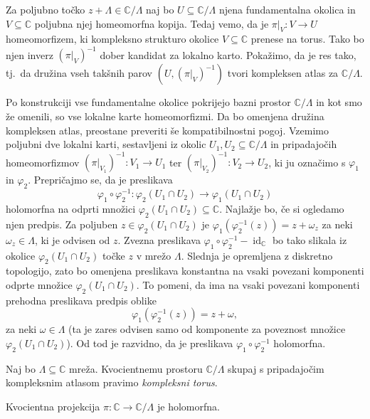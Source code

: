 \documentclass[mat1]{fmfdelo}
\numberwithin{equation}{section}
\newcommand{\C}{\mathbb C}
\newcommand{\om}{\omega}
\newcommand{\inv}{^{-1}}
\newcommand{\torus}{\C/\Lambda}
\newcommand{\tj}{tj.\ }
\DeclareMathOperator{\id}{id}
\theoremstyle{definition}
\begin{document}
\begin{dokaz}
    Za poljubno točko $z + \Lambda \in \torus$ naj bo $U \subseteq \torus$ njena fundamentalna okolica in $V \subseteq \C$ poljubna njej homeomorfna kopija. Tedaj vemo, da je $\pi|_V : V \to U$ homeomorfizem, ki kompleksno strukturo okolice $V \subseteq \C$ prenese na torus. Tako bo njen inverz $(\pi|_V)\inv$ dober kandidat za lokalno karto. Pokažimo, da je res tako, \tj da družina vseh takšnih parov $(U, (\pi|_V)\inv)$ tvori kompleksen atlas za $\torus$. 

    Po konstrukciji vse fundamentalne okolice pokrijejo bazni prostor $\torus$ in kot smo že omenili, so vse lokalne karte homeomorfizmi. Da bo omenjena družina kompleksen atlas, preostane preveriti še kompatibilnostni pogoj. Vzemimo poljubni dve lokalni karti, sestavljeni iz okolic $U_1, U_2 \subseteq \torus$ in pripadajočih homeomorfizmov $(\pi|_{V_1})\inv : V_1 \to U_1$ ter $(\pi|_{V_2})\inv : V_2 \to U_2$, ki ju označimo s $\varphi_1$ in $\varphi_2$. Prepričajmo se, da je preslikava 
    \[
        \varphi_1 \circ \varphi_2\inv : \varphi_2(U_1 \cap U_2) \to  \varphi_1(U_1 \cap U_2)
    \]
    holomorfna na odprti množici $\varphi_2(U_1 \cap U_2) \subseteq \C$. Najlažje bo, če si ogledamo njen predpis. Za poljuben $z \in \varphi_2(U_1 \cap U_2)$ je $\varphi_1(\varphi_2\inv(z)) = z + \om_z$ za neki $\om_z \in \Lambda$, ki je odvisen od $z$. Zvezna preslikava $\varphi_1 \circ \varphi_2\inv - \id_\C$ bo tako slikala iz okolice $\varphi_2(U_1 \cap U_2)$ točke $z$ v mrežo $\Lambda$. Slednja je opremljena z diskretno topologijo, zato bo omenjena preslikava konstantna na vsaki povezani komponenti odprte množice $\varphi_2(U_1 \cap U_2)$. To pomeni, da ima na vsaki povezani komponenti prehodna preslikava predpis oblike 
    \[
        \varphi_1(\varphi_2\inv(z)) = z + \om,
    \]
    za neki $\om \in \Lambda$ (ta je zares odvisen samo od komponente za poveznost množice $\varphi_2(U_1 \cap U_2)$). Od tod je razvidno, da je preslikava $\varphi_1 \circ \varphi_2\inv$ holomorfna. 
\end{dokaz}

\begin{definicija}
    Naj bo $\Lambda \subseteq \C$ mreža. Kvocientnemu prostoru $\torus$ skupaj s pripadajočim kompleksnim atlasom pravimo \emph{kompleksni torus}.  
\end{definicija}

\begin{lema}
    \label{holomorfnost projekcije}
    Kvocientna projekcija $\pi : \C \to \torus$ je holomorfna. 
\end{lema}
\end{document}
